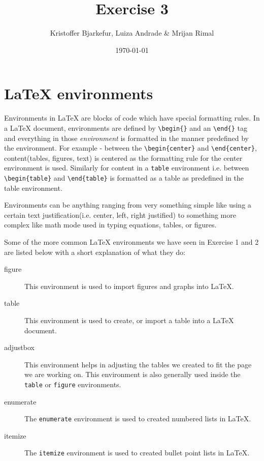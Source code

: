 \documentclass{article}            %
\title{Exercise 3} 	%
\author{Kristoffer Bjarkefur, Luiza Andrade \& Mrijan Rimal}
\date{\today}                    							%
\begin{document}
           

\maketitle
\newpage

\section*{{\LaTeX} environments}
Environments in {\LaTeX} are blocks of code which have special formatting rules. In a {\LaTeX} document, environments are defined by \verb|\begin{}| and an \verb|\end{}| tag and everything in those \textit{environment} is formatted in the manner predefined by the environment. For example - between the \verb|\begin{center}| and \verb|\end{center}|, content(tables, figures, text) is centered as the formatting rule for the center environment is used. Similarly for content in a \texttt{table} environment i.e. between \verb|\begin{table}| and \verb|\end{table}| is formatted as a table as predefined in the table environment. 

Environments can be anything ranging from very something simple like using a certain text justification(i.e. center, left, right justified) to something more complex like math mode used in typing equations, tables, or figures. 

Some of the more common {\LaTeX} environments we have seen in Exercise 1 and 2 are listed below with a short explanation of what they do: 

\begin{description}
	\item[figure] This environment is used to import figures and graphs into {\LaTeX}. 
	\item[table] This environment is used to create, or import a table into a {\LaTeX} document.
	\item[adjustbox] This environment helps in adjusting the tables we created to fit the page we are working on. This environment is also generally used inside the \texttt{table} or \texttt{figure} environments.
	\item[enumerate] The \texttt{enumerate} environment is used to created numbered lists in {\LaTeX}. 
	\item[itemize] The \texttt{itemize} environment is used to created bullet point lists in {\LaTeX}.
\end{description} 
\end{document}
